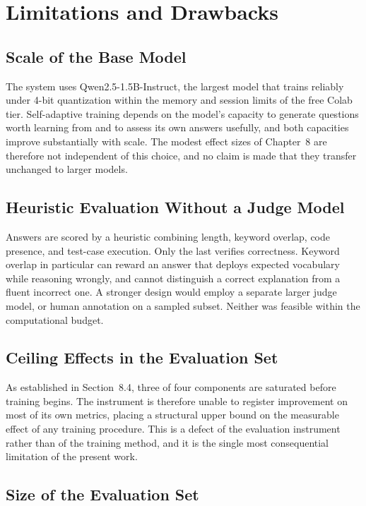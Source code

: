 \documentclass[12pt,a4paper]{report}
\begin{document}
\chapter{Limitations and Drawbacks}

\section{Scale of the Base Model}

The system uses Qwen2.5-1.5B-Instruct, the largest model that trains reliably under 4-bit quantization within the memory and session limits of the free Colab tier. Self-adaptive training depends on the model's capacity to generate questions worth learning from and to assess its own answers usefully, and both capacities improve substantially with scale. The modest effect sizes of Chapter~8 are therefore not independent of this choice, and no claim is made that they transfer unchanged to larger models.

\section{Heuristic Evaluation Without a Judge Model}

Answers are scored by a heuristic combining length, keyword overlap, code presence, and test-case execution. Only the last verifies correctness. Keyword overlap in particular can reward an answer that deploys expected vocabulary while reasoning wrongly, and cannot distinguish a correct explanation from a fluent incorrect one. A stronger design would employ a separate larger judge model, or human annotation on a sampled subset. Neither was feasible within the computational budget.

\section{Ceiling Effects in the Evaluation Set}

As established in Section~8.4, three of four components are saturated before training begins. The instrument is therefore unable to register improvement on most of its own metrics, placing a structural upper bound on the measurable effect of any training procedure. This is a defect of the evaluation instrument rather than of the training method, and it is the single most consequential limitation of the present work.

\section{Size of the Evaluation Set}
\end{document}
